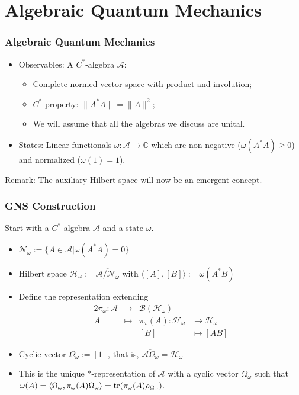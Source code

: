 \documentclass{beamer}
\begin{document}
\section{Algebraic Quantum Mechanics}

\begin{frame}
	\frametitle{Algebraic Quantum Mechanics}
	\begin{itemize}
		\item Observables: A $C^*$-algebra $\mathcal{A}$:
		\begin{itemize}
			\item Complete normed vector space with product and involution;
			\item $C^*$ property: $\|A^*A\|=\|A\|^2$;
			\item We will assume that all the algebras we discuss are unital.
		\end{itemize}
		\item States:  Linear functionals $\omega:\mathcal{A}\rightarrow\mathbb{C}$ which are non-negative ($\omega(A^*A)\geq 0$) and normalized ($\omega(1)=1$).
	\end{itemize}
	Remark: The auxiliary Hilbert space will now be an emergent concept.
\end{frame}

\begin{frame}
	\frametitle{GNS Construction}
	Start with a $C^*$-algebra $\mathcal{A}$ and a state $\omega$.
	\begin{itemize}
		\item $\mathcal{N}_\omega:=\{A\in\mathcal{A}|\omega(A^*A)=0\}$
		\item Hilbert space $\mathcal{H}_\omega := \overline{\mathcal{A}/\mathcal{N}_\omega}$ with $\langle [A], [B]\rangle := \omega(A^*B)$ 
		\item Define the representation extending
		\begin{alignat*}{2}
			\pi_\omega:\mathcal{A} & \rightarrow &\mathcal{B}(\mathcal{H}_\omega) \\
			A & \mapsto & \pi_\omega(A):\mathcal{H}_\omega & \rightarrow\mathcal{H}_\omega \\
			&& [B] & \mapsto [AB]
		\end{alignat*}
		\item Cyclic vector $\Omega_\omega := [1]$, that is, $\overline{\mathcal{A}\Omega_\omega}=\mathcal{H}_\omega$
		\item This is the unique $*$-representation of $\mathcal{A}$ with a cyclic vector $\Omega_\omega$ such that $\omega(A)=\langle\Omega_\omega,\pi_\omega(A)\Omega_\omega\rangle=\tr(\pi_\omega(A)\rho_{\Omega_\omega})$.
	\end{itemize}
\end{frame}
\end{document}

